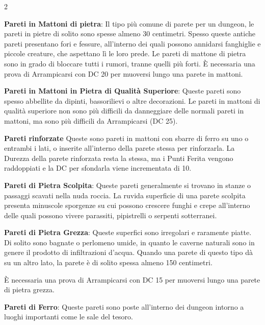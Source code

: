 \begin{multicols}{2}

\textbf{Pareti in Mattoni di pietra}: Il tipo più comune di parete per un dungeon, le pareti in pietre di solito sono spesse almeno 30 centimetri. Spesso queste antiche pareti presentano fori e fessure, all'interno dei quali possono annidarsi fanghiglie e piccole creature, che aspettano lì le loro prede. Le pareti di mattone di pietra sono in grado di bloccare tutti i rumori, tranne quelli più forti. È necessaria una prova di Arrampicarsi con DC 20 per muoversi lungo una parete in mattoni.

\textbf{Pareti in Mattoni in Pietra di Qualità Superiore}: Queste pareti sono spesso abbellite da dipinti, bassorilievi o altre decorazioni. Le pareti in mattoni di qualità superiore non sono più difficili da danneggiare delle normali pareti in mattoni, ma sono più difficili da Arrampicarsi (DC 25).

\textbf{Pareti rinforzate} Queste sono pareti in mattoni con sbarre di ferro su uno o entrambi i lati, o inserite all'interno della parete stessa per rinforzarla. La Durezza della parete rinforzata resta la stessa, ma i Punti Ferita vengono raddoppiati e la DC per sfondarla viene incrementata di 10.

\textbf{Pareti di Pietra Scolpita}: Queste pareti generalmente si trovano in stanze o passaggi scavati nella nuda roccia. La ruvida superficie di una parete scolpita presenta minuscole sporgenze su cui possono crescere funghi e crepe all'interno delle quali possono vivere parassiti, pipistrelli o serpenti sotterranei.


\textbf{Pareti di Pietra Grezza}: Queste superfici sono irregolari e raramente piatte. Di solito sono bagnate o perlomeno umide, in quanto le caverne naturali sono in genere il prodotto di infiltrazioni d'acqua. Quando una parete di questo tipo dà su un altro lato, la parete è di solito spessa almeno 150 centimetri.

È necessaria una prova di Arrampicarsi con DC 15 per muoversi lungo una parete di pietra grezza.

\textbf{Pareti di Ferro}: Queste pareti sono poste all'interno dei dungeon intorno a luoghi importanti come le sale del tesoro.


\end{multicols}
